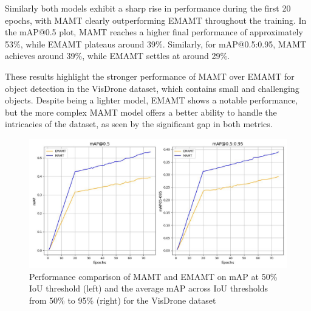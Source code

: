 Similarly both models exhibit a sharp rise in performance during the first 20 epochs, with MAMT clearly outperforming EMAMT throughout the training. In the 
mAP@0.5 plot, MAMT reaches a higher final performance of approximately 53\%, while EMAMT plateaus around 39\%. Similarly, for mAP@0.5:0.95, MAMT achieves 
around 39\%, while EMAMT settles at around 29\%.

These results highlight the stronger performance of MAMT over EMAMT for object detection in the VisDrone dataset, which contains small and challenging objects. 
Despite being a lighter model, EMAMT shows a notable performance, but the more complex MAMT model offers a better ability to handle the intricacies of the dataset, 
as seen by the significant gap in both metrics.

\begin{figure}[h!]
    \centering
    \includegraphics[scale=0.55]{Figures/vis_train.jpg}
    \caption{Performance comparison of MAMT and EMAMT on mAP at 50\% IoU threshold (left) and the average mAP across IoU thresholds from 50\% to 95\% (right) 
    for the VisDrone dataset}
    \label{fig:uav-train}
\end{figure}

